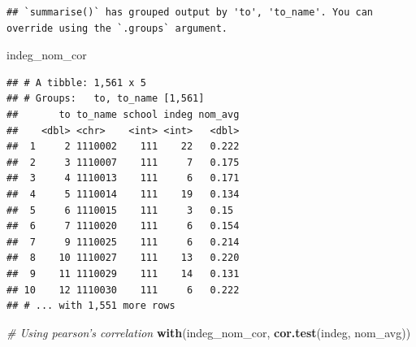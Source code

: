 \documentclass[]{book}
\newenvironment{Shaded}{\begin{snugshade}}{\end{snugshade}}
\newcommand{\CommentTok}[1]{\textcolor[rgb]{0.56,0.35,0.01}{\textit{#1}}}
\newcommand{\DataTypeTok}[1]{\textcolor[rgb]{0.13,0.29,0.53}{#1}}
\newcommand{\DecValTok}[1]{\textcolor[rgb]{0.00,0.00,0.81}{#1}}
\newcommand{\KeywordTok}[1]{\textcolor[rgb]{0.13,0.29,0.53}{\textbf{#1}}}
\newcommand{\NormalTok}[1]{#1}
\newcommand{\OperatorTok}[1]{\textcolor[rgb]{0.81,0.36,0.00}{\textbf{#1}}}
\newcommand{\StringTok}[1]{\textcolor[rgb]{0.31,0.60,0.02}{#1}}
\begin{document}
\begin{Shaded}
\end{Shaded}

\begin{verbatim}
## `summarise()` has grouped output by 'to', 'to_name'. You can override using the `.groups` argument.
\end{verbatim}

\begin{Shaded}
\begin{Highlighting}[]
\NormalTok{indeg_nom_cor}
\end{Highlighting}
\end{Shaded}

\begin{verbatim}
## # A tibble: 1,561 x 5
## # Groups:   to, to_name [1,561]
##       to to_name school indeg nom_avg
##    <dbl> <chr>    <int> <int>   <dbl>
##  1     2 1110002    111    22   0.222
##  2     3 1110007    111     7   0.175
##  3     4 1110013    111     6   0.171
##  4     5 1110014    111    19   0.134
##  5     6 1110015    111     3   0.15 
##  6     7 1110020    111     6   0.154
##  7     9 1110025    111     6   0.214
##  8    10 1110027    111    13   0.220
##  9    11 1110029    111    14   0.131
## 10    12 1110030    111     6   0.222
## # ... with 1,551 more rows
\end{verbatim}

\begin{Shaded}
\begin{Highlighting}[]
\CommentTok{# Using pearson's correlation}
\KeywordTok{with}\NormalTok{(indeg_nom_cor, }\KeywordTok{cor.test}\NormalTok{(indeg, nom_avg))}
\end{Highlighting}
\end{Shaded}
\end{document}
